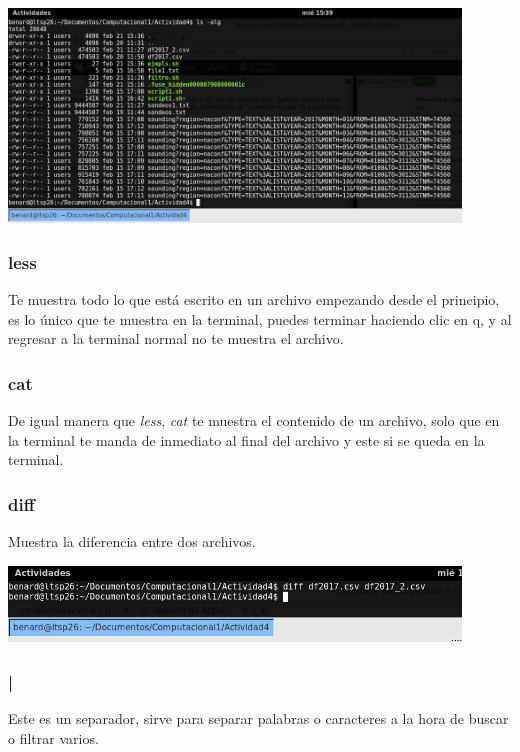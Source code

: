 \documentclass{article}
\begin{document}
\begin{center}
	\includegraphics[width=12cm]{lsalg.png}
\end{center}
\vspace{0.3cm}

\subsubsection*{less}
Te muestra todo lo que está escrito en un archivo empezando desde el principio, es lo único que te muestra en la terminal, puedes terminar haciendo clic en q, y al regresar a la terminal normal no te muestra el archivo.

\subsubsection*{cat}
De igual manera que \textit{less}, \textit{cat} te muestra el contenido de un archivo, solo que en la terminal te manda de inmediato al final del archivo y este si se queda en la terminal.

\subsubsection*{diff}
Muestra la diferencia entre dos archivos.

\begin{center}
	\includegraphics[width=12cm]{diff.png}
\end{center}
\vspace{0.3cm}

\subsubsection*{|}
Este es un separador, sirve para separar palabras o caracteres a la hora de buscar o filtrar varios.
\end{document}
